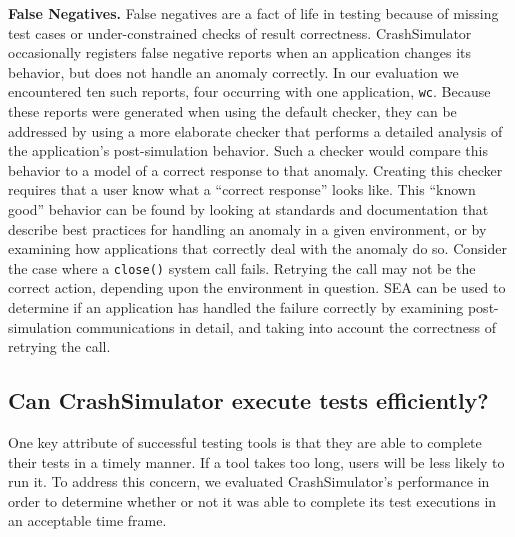 
\textbf{False Negatives.}
False negatives are a fact of life in testing
because of missing test cases or under-constrained checks
of result correctness.
CrashSimulator occasionally registers  false negative reports
when an application changes its behavior,
but does not handle an anomaly correctly.
In our evaluation we encountered ten such reports, four
occurring with one application, {\tt wc}.
Because these reports were generated when using the default checker,
they can be addressed by
using a more elaborate checker that
performs a detailed analysis
of the application's post-simulation behavior.
Such a checker would compare this behavior to a model of
a correct response to that anomaly.
Creating this checker requires
that a user know
what a ``correct response''
looks like.
This ``known good'' behavior can be found
by looking at standards and documentation
that describe best practices for handling an anomaly
in a given environment,
or by examining how applications that correctly
deal with the anomaly do so.
Consider the case where a {\tt close()} system call fails.
Retrying the call may not be the correct action,
depending upon the environment in question.
SEA can be used to determine if an application
has handled the failure correctly
by examining post-simulation communications in detail,
and taking into account the correctness of retrying the call.

\subsection{Can CrashSimulator execute tests efficiently?}
\label{sec-perf}

One key attribute of successful testing tools is that they are able to
complete their tests in a timely manner.  If a tool takes too long,
users will be less likely to run it.
To address this concern,
we evaluated CrashSimulator's performance
in order to determine whether or not it was able to complete its
test executions in an acceptable time frame.

